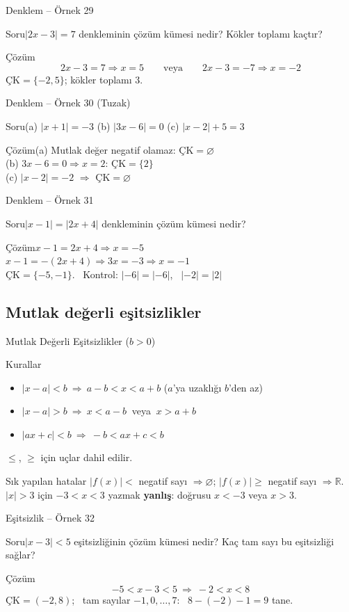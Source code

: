 \documentclass[aspectratio=169,11pt]{beamer}
\newcommand{\soru}[3]{%
\begin{frame}{#1}
  \begin{block}{Soru}\large #2\end{block}
  \pause
  \begin{exampleblock}{Çözüm}\large #3\end{exampleblock}
\end{frame}}
\begin{document}
\soru{Denklem -- Örnek 29}
{\(|2x-3|=7\) denkleminin çözüm kümesi nedir? Kökler toplamı kaçtır?}
{\[2x-3=7\Rightarrow x=5\qquad\text{veya}\qquad 2x-3=-7\Rightarrow x=-2\]
\(\text{ÇK}=\{-2,5\}\); \quad kökler toplamı \(3\).}

\soru{Denklem -- Örnek 30 (Tuzak)}
{(a) \(|x+1|=-3\) \qquad (b) \(|3x-6|=0\) \qquad (c) \(|x-2|+5=3\)}
{(a) Mutlak değer negatif olamaz: \(\text{ÇK}=\varnothing\)\\[3pt]
(b) \(3x-6=0\Rightarrow x=2\): \(\text{ÇK}=\{2\}\)\\[3pt]
(c) \(|x-2|=-2\) \(\Rightarrow\) \(\text{ÇK}=\varnothing\)}

\soru{Denklem -- Örnek 31}
{\(|x-1|=|2x+4|\) denkleminin çözüm kümesi nedir?}
{\(x-1=2x+4\Rightarrow x=-5\)\\[2pt]
\(x-1=-(2x+4)\Rightarrow 3x=-3\Rightarrow x=-1\)\\[3pt]
\(\text{ÇK}=\{-5,-1\}\). \ Kontrol: \(|-6|=|-6|\), \ \(|-2|=|2|\) \ \checkmark}

\subsection{Mutlak değerli eşitsizlikler}
\begin{frame}{Mutlak Değerli Eşitsizlikler (\(b>0\))}
\begin{block}{Kurallar}
\begin{itemize}
\item \(|x-a|<b\ \Rightarrow\ a-b<x<a+b\) \quad (\(a\)'ya uzaklığı \(b\)'den az)
\item \(|x-a|>b\ \Rightarrow\ x<a-b\ \) veya \(\ x>a+b\)
\item \(|ax+c|<b\ \Rightarrow\ -b<ax+c<b\)
\end{itemize}
\(\le\), \(\ge\) için uçlar dahil edilir.
\end{block}
\begin{alertblock}{Sık yapılan hatalar}
\(|f(x)|<\) negatif sayı \(\Rightarrow\varnothing\); \quad \(|f(x)|\ge\) negatif sayı \(\Rightarrow\mathbb{R}\).\\
\(|x|>3\) için \(-3<x<3\) yazmak \textbf{yanlış}: doğrusu \(x<-3\) veya \(x>3\).
\end{alertblock}
\end{frame}

\soru{Eşitsizlik -- Örnek 32}
{\(|x-3|<5\) eşitsizliğinin çözüm kümesi nedir? Kaç tam sayı bu eşitsizliği sağlar?}
{\[-5<x-3<5\ \Rightarrow\ -2<x<8\]
\(\text{ÇK}=(-2,8)\); \ tam sayılar \(-1,0,\dots,7\): \ \(8-(-2)-1=9\) tane.}
\end{document}
